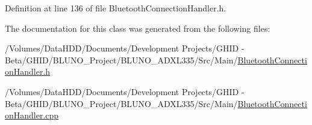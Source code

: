 \-Definition at line 136 of file \-Bluetooth\-Connection\-Handler.\-h.



\-The documentation for this class was generated from the following files\-:\begin{DoxyCompactItemize}
\item 
/\-Volumes/\-Data\-H\-D\-D/\-Documents/\-Development Projects/\-G\-H\-I\-D -\/ Beta/\-G\-H\-I\-D/\-B\-L\-U\-N\-O\-\_\-\-Project/\-B\-L\-U\-N\-O\-\_\-\-A\-D\-X\-L335/\-Src/\-Main/\hyperlink{_bluetooth_connection_handler_8h}{\-Bluetooth\-Connection\-Handler.\-h}\item 
/\-Volumes/\-Data\-H\-D\-D/\-Documents/\-Development Projects/\-G\-H\-I\-D -\/ Beta/\-G\-H\-I\-D/\-B\-L\-U\-N\-O\-\_\-\-Project/\-B\-L\-U\-N\-O\-\_\-\-A\-D\-X\-L335/\-Src/\-Main/\hyperlink{_bluetooth_connection_handler_8cpp}{\-Bluetooth\-Connection\-Handler.\-cpp}\end{DoxyCompactItemize}
